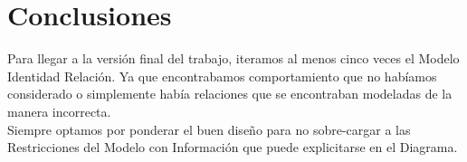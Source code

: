 \section{Conclusiones}

Para llegar a la versi\'on final del trabajo, iteramos al menos cinco veces el Modelo Identidad Relaci\'on. Ya que encontrabamos comportamiento que no hab\'iamos considerado o simplemente hab\'ia relaciones que se encontraban modeladas de la manera incorrecta.\\

Siempre optamos por ponderar el buen dise\~no para no sobre-cargar a las Restricciones del Modelo con Informaci\'on que puede explicitarse en el Diagrama.